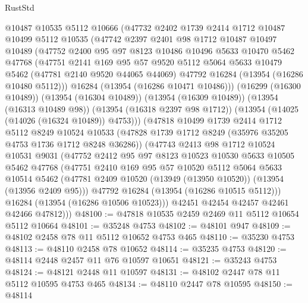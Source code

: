 \begin{lexlean}{RustStd}
\begin{coremodule}
    @10487
    @10535
    @5112
    @10666
    (@47732
      @2402
      @1739
      @2414
      @1712
      @10487
      @10499
      @5112
      @10535
      (@47742
        @2397
        @2401
        @98
        @1712
        @10487
        @10497
        @10489
        (@47752
          @2400
          @95
          @97
          @8123
          @10486
          @10496
          @5633
          @10470
          @5462
          @47768
          (@47751
            @2141
            @169
            @95
            @57
            @9520
            @5112
            @5064
            @5633
            @10479
            @5462
            (@47781 @2140 @9520 @44065 @44069)
            @47792
            @16284
            (@13954 (@16286 @10480 @5112)))
          @16284
          (@13954 (@16286 @10471 @10486)))
        (@16299 (@16300 @10489))
        (@13954 (@16304 @10489))
        (@13954 (@16309 @10489))
        (@13954 (@16313 @10489 @98))
        (@13954 (@16318 @2397 @98 @1712))
        (@13954 (@14025 (@14026 (@16324 @10489)) @4753)))
      (@47818
        @10499
        @1739
        @2414
        @1712
        @5112
        @8249
        @10524
        @10533
        (@47828 @1739 @1712 @8249 (@35976 @35205 @4753 @1736 @1712 @8248 @36286))
        (@47743
          @2413
          @98
          @1712
          @10524
          @10531
          @9031
          (@47752
            @2412
            @95
            @97
            @8123
            @10523
            @10530
            @5633
            @10505
            @5462
            @47768
            (@47751
              @2410
              @169
              @95
              @57
              @10520
              @5112
              @5064
              @5633
              @10514
              @5462
              (@47781 @2409 @10520 (@13949 (@13950 @10520)) (@13954 (@13956 @2409 @95)))
              @47792
              @16284
              (@13954 (@16286 @10515 @5112)))
            @16284
            (@13954 (@16286 @10506 @10523)))
          @42451
          @42454
          @42457
          @42461
          @42466
          @47812)))
@48100 := @47818 @10535 @2459 @2469 @11 @5112 @10654 @5112 @10664
@48101 := @35248 @4753
@48102 := @48101 @947
@48109 := @48102 @2458 @78 @11 @5112 @10652 @4753 @465
@48110 := @35230 @4753
@48113 := @48110 @2458 @78 @10652
@48114 := @35235 @4753
@48120 := @48114 @2448 @2457 @11 @76 @10597 @10651
@48121 := @35243 @4753
@48124 := @48121 @2448 @11 @10597
@48131 := @48102 @2447 @78 @11 @5112 @10595 @4753 @465
@48134 := @48110 @2447 @78 @10595
@48150 := @48114

\end{coremodule}
\end{lexlean}
